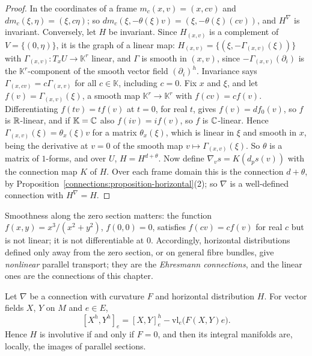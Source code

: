 \begin{proof}
In the coordinates of a frame $m_c(x, v) = (x, cv)$ and $dm_c(\xi, \eta) = (\xi, c\eta)$; so $dm_c(\xi, -\theta(\xi)v) = (\xi, -\theta(\xi)(cv))$, and $H^\nabla$ is invariant. Conversely, let $H$
be invariant. Since $H_{(x, v)}$ is a complement of $V = \{(0, \eta)\}$, it is the graph of a linear map: $H_{(x, v)} = \{(\xi, -\Gamma_{(x, v)}(\xi))\}$ with
$\Gamma_{(x, v)} \colon T_xU \to \mathbb{K}^r$ linear, and $\Gamma$ is smooth in $(x, v)$, since $-\Gamma_{(x, v)}(\partial_i)$ is the $\mathbb{K}^r$-component of the smooth vector field
$(\partial_i)^h$. Invariance says $\Gamma_{(x, cv)} = c\Gamma_{(x, v)}$ for all $c \in \mathbb{K}$, including $c = 0$. Fix $x$ and $\xi$, and let $f(v) = \Gamma_{(x, v)}(\xi)$, a smooth map
$\mathbb{K}^r \to \mathbb{K}^r$ with $f(cv) = cf(v)$. Differentiating $f(tv) = tf(v)$ at $t = 0$, for real $t$, gives $f(v) = df_0(v)$, so $f$ is $\mathbb{R}$-linear, and if $\mathbb{K} = \mathbb{C}$ also
$f(iv) = if(v)$, so $f$ is $\mathbb{C}$-linear. Hence $\Gamma_{(x, v)}(\xi) = \theta_x(\xi)v$ for a matrix $\theta_x(\xi)$, which is linear in $\xi$ and smooth in $x$, being the derivative at $v = 0$
of the smooth map $v \mapsto \Gamma_{(x, v)}(\xi)$. So $\theta$ is a matrix of $1$-forms, and over $U$, $H = H^{d + \theta}$. Now define $\nabla_vs = K(d_ps(v))$ with the connection map $K$ of
$H$. Over each frame domain this is the connection $d + \theta$, by Proposition~\ref{connections:proposition-horizontal}(2); so $\nabla$ is a well-defined connection with $H^\nabla = H$.
\end{proof}

Smoothness along the zero section matters: the function $f(x, y) = x^3/(x^2 + y^2)$, $f(0, 0) = 0$, satisfies $f(cv) = cf(v)$ for real $c$ but is not linear; it is not differentiable at
$0$. Accordingly, horizontal distributions defined only away from the zero section, or on general fibre bundles, give \emph{nonlinear} parallel transport; they are the \emph{Ehresmann
connections}, and the linear ones are the connections of this chapter.

\begin{proposition}\label{connections:proposition-horizontal-curvature}
Let $\nabla$ be a connection with curvature $F$ and horizontal distribution $H$. For vector fields $X$, $Y$ on $M$ and $e \in E$,
\[
[X^h, Y^h]_e = [X, Y]^h_e - \mathrm{vl}_e\bigl(F(X, Y)e\bigr).
\]
Hence $H$ is involutive if and only if $F = 0$, and then its integral manifolds are, locally, the images of parallel sections.
\end{proposition}

